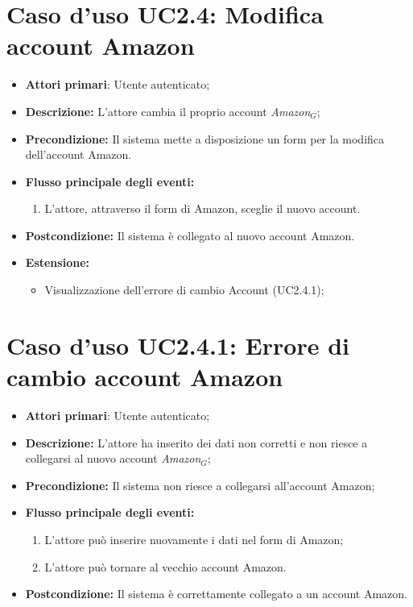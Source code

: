 		\section{Caso d'uso UC2.4: Modifica account Amazon }
		\begin{itemize}
			\item \textbf{Attori primari}: Utente autenticato;
			\item \textbf{Descrizione:} L'attore cambia il proprio account \textit{Amazon$_{G}$};
			\item \textbf{Precondizione:} Il sistema mette a disposizione un form per la modifica dell'account Amazon.
			\item \textbf{Flusso principale degli eventi:}
			\begin{enumerate}
				\item L'attore, attraverso il form di Amazon, sceglie il nuovo account.
			\end{enumerate}
			\item \textbf{Postcondizione:} Il sistema è collegato al nuovo account Amazon.
			\item \textbf{Estensione:}
			\begin{itemize}
				\item Visualizzazione dell'errore di cambio Account (UC2.4.1);
			\end{itemize}
		\end{itemize}
		\section{Caso d'uso UC2.4.1: Errore di cambio account Amazon }
		\begin{itemize}
			\item \textbf{Attori primari}: Utente autenticato;
			\item \textbf{Descrizione:} L'attore ha inserito dei dati non corretti e non riesce a collegarsi al nuovo account \textit{Amazon$_{G}$};
			\item \textbf{Precondizione:} Il sistema non riesce a collegarsi all'account Amazon;
			\item \textbf{Flusso principale degli eventi:}
			\begin{enumerate}
				\item L'attore può inserire nuovamente i dati nel form di Amazon;
				\item L'attore può tornare al vecchio account Amazon.
			\end{enumerate}
			\item \textbf{Postcondizione:} Il sistema è correttamente collegato a un account Amazon.
		\end{itemize}
